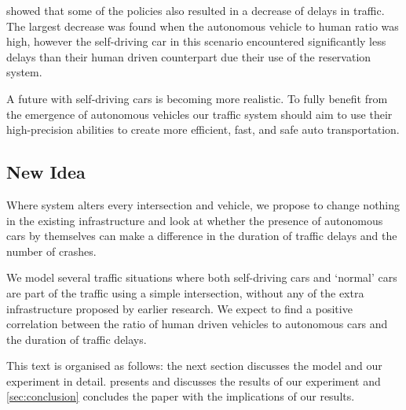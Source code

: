 \textcite{dresner2007sharing} showed that some of the policies also resulted in a decrease of delays in traffic. The largest decrease was found when the autonomous vehicle to human ratio was high, however the self-driving car in this scenario encountered significantly less delays than their human driven counterpart due their use of the reservation system.

A future with self-driving cars is becoming more realistic. To fully benefit from the emergence of autonomous vehicles our traffic system should aim to use their high-precision abilities to create more efficient, fast, and safe auto transportation.


\subsection{New Idea}
\label{sub:intro:new_idea}	
Where \textcite{dresner2007sharing} system alters every intersection and vehicle, we propose to change nothing in the existing infrastructure and look at whether the presence of autonomous cars by themselves can make a difference in the duration of traffic delays and the number of crashes. 

We model several traffic situations where both self-driving cars and `normal' cars are part of the traffic using a simple intersection, without any of the extra infrastructure proposed by earlier research. We expect to find a positive correlation between the ratio of human driven vehicles to autonomous cars and the duration of traffic delays.

This text is organised as follows: the next section discusses the model and our experiment in detail.  presents and discusses the results of our experiment and \cref{sec:conclusion} concludes the paper with the implications of our results.